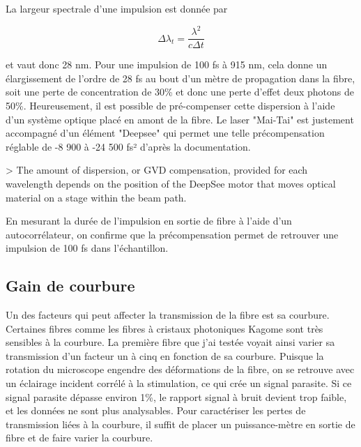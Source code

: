 La largeur spectrale d'une impulsion est donnée par

$$
\Delta \lambda_t = \frac{\lambda^2}{c\Delta t}
$$

et vaut donc 28 nm. Pour une impulsion de 100 fs à 915 nm, cela donne un élargissement de l'ordre de 28 fs au bout d'un mètre de propagation dans la fibre, soit une perte de concentration de 30\% et donc une perte d'effet deux photons de 50\%. Heureusement, il est possible de pré-compenser cette dispersion à l'aide d'un système optique placé en amont de la fibre. Le laser "Mai-Tai" est justement accompagné d'un élément "Deepsee" qui permet une telle précompensation réglable de -8 900 à -24 500 fs² d'après la documentation.

> The amount of dispersion, or GVD compensation, provided for each wavelength depends on the position of the DeepSee motor that moves optical material on a stage within the beam path.

En mesurant la durée de l'impulsion en sortie de fibre à l'aide d'un autocorrélateur, on confirme que la précompensation permet de retrouver une impulsion de 100 fs dans l'échantillon.

\subsection{Gain de courbure}



Un des facteurs qui peut affecter la transmission de la fibre est sa courbure. Certaines fibres comme les fibres à cristaux photoniques Kagome sont très sensibles à la courbure. La première fibre que j'ai testée voyait ainsi varier sa transmission d'un facteur un à cinq en fonction de sa courbure. Puisque la rotation du microscope engendre des déformations de la fibre, on se retrouve avec un éclairage incident corrélé à la stimulation, ce qui crée un signal parasite. Si ce signal parasite dépasse environ 1\%, le rapport signal à bruit devient trop faible, et les données ne sont plus analysables. Pour caractériser les pertes de transmission liées à la courbure, il suffit de placer un puissance-mètre en sortie de fibre et de faire varier la courbure.


